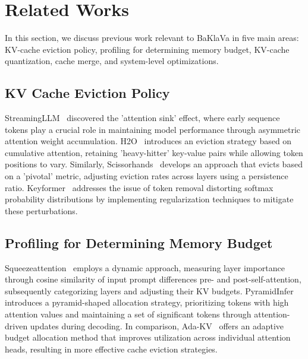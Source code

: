 \section{Related Works}\label{sec:related}
In this section, we discuss previous work relevant to BaKlaVa in five main areas: KV-cache eviction policy, profiling for determining memory budget, KV-cache quantization, cache merge, and system-level optimizations. 

\subsection{KV Cache Eviction Policy}
StreamingLLM~\cite{streamingllm} discovered the 'attention sink' effect, where early sequence tokens play a crucial role in maintaining model performance through asymmetric attention weight accumulation. H2O~\cite{h2o} introduces an eviction strategy based on cumulative attention, retaining 'heavy-hitter' key-value pairs while allowing token positions to vary. Similarly, Scissorhands~\cite{scissorhands} develops an approach that evicts based on a 'pivotal' metric, adjusting eviction rates across layers using a persistence ratio. Keyformer~\cite{keyformer} addresses the issue of token removal distorting softmax probability distributions by implementing regularization techniques to mitigate these perturbations. 

\subsection{Profiling for Determining Memory Budget}
Squeezeattention~\cite{squeezeattention} employs a dynamic approach, measuring layer importance through cosine similarity of input prompt differences pre- and post-self-attention, subsequently categorizing layers and adjusting their KV budgets. PyramidInfer~\cite{pyramidinfer} introduces a pyramid-shaped allocation strategy, prioritizing tokens with high attention values and maintaining a set of significant tokens through attention-driven updates during decoding. In comparison, Ada-KV~\cite{adakv} offers an adaptive budget allocation method that improves utilization across individual attention heads, resulting in more effective cache eviction strategies.



